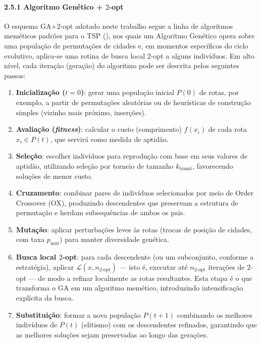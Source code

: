 \paragraph{\texorpdfstring{2.5.1 Algoritmo Genético +
\(2\)-opt}{2.5.1 Algoritmo Genético + 2-opt}}\label{sec-251-ga-2opt}

O esquema GA+\(2\)-opt adotado neste trabalho segue a linha de
algoritmos meméticos padrões para o TSP
(), nos quais um Algoritmo
Genético opera sobre uma população de permutações de cidades e, em
momentos específicos do ciclo evolutivo, aplica-se uma rotina de busca
local \(2\)-opt a alguns indivíduos. Em alto nível, cada iteração
(geração) do algoritmo pode ser descrita pelos seguintes passos:

\begin{enumerate}
\def\labelenumi{\arabic{enumi}.}
\tightlist
\item
  \textbf{Inicialização (\(t=0\))}: gerar uma população inicial \(P(0)\)
  de rotas, por exemplo, a partir de permutações aleatórias ou de
  heurísticas de construção simples (vizinho mais próximo, inserções).
\item
  \textbf{Avaliação (\emph{fitness})}: calcular o custo (comprimento)
  \(f(x_i)\) de cada rota \(x_i \in P(t)\), que servirá como medida de
  aptidão.
\item
  \textbf{Seleção}: escolher indivíduos para reprodução com base em seus
  valores de aptidão, utilizando seleção por torneio de tamanho
  \(k_{\text{trnmt}}\), favorecendo soluções de menor custo.
\item
  \textbf{Cruzamento}: combinar pares de indivíduos selecionados por
  meio de Order Crossover (OX), produzindo descendentes que preservam a
  estrutura de permutação e herdam subsequências de ambos os pais.
\item
  \textbf{Mutação}: aplicar perturbações leves às rotas (trocas de
  posição de cidades, com taxa \(p_{\text{mut}}\)) para manter
  diversidade genética.
\item
  \textbf{Busca local \(2\)-opt}: para cada descendente (ou um
  subconjunto, conforme a estratégia), aplicar
  \(\mathcal{L}(x, n_{2\text{-opt}})\) --- isto é, executar até
  \(n_{2\text{-opt}}\) iterações de \(2\)-opt --- de modo a refinar
  localmente as rotas resultantes. Esta etapa é o que transforma o GA em
  um algoritmo memético, introduzindo intensificação explícita da busca.
\item
  \textbf{Substituição}: formar a nova população \(P(t+1)\) combinando
  os melhores indivíduos de \(P(t)\) (elitismo) com os descendentes
  refinados, garantindo que as melhores soluções sejam preservadas ao
  longo das gerações.
\end{enumerate}

